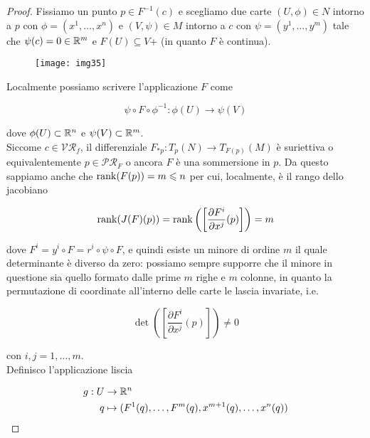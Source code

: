 \begin{proof}
	Fissiamo un punto $ p \in F^{-1}(c) $ e scegliamo due carte $ (U,\phi) \in N $ intorno a $ p $ con $ \phi = (x^{1},\dots,x^{n}) $ e $ (V,\psi) \in M $ intorno a $ c $ con $ \psi = (y^{1},\dots,y^{m}) $ tale che $ \psi(c)=0 \in \mathbb{R}^{m} $ e $ F(U) \subseteq V $+ (in quanto $ F $ è continua).
	
	\begin{figure}[H]
		\centering
		\texttt{[image: img35]}
	\end{figure}

	Localmente possiamo scrivere l'applicazione $ F $ come
	
	\begin{equation}
		\psi \circ F \circ \phi^{-1} : \phi(U) \to \psi(V)
	\end{equation}

	dove $ \phi(U) \subset \mathbb{R}^{n} $ e $ \psi(V) \subset \mathbb{R}^{m} $.\\
	Siccome $ c \in \mathcal{VR}_{f} $, il differenziale $ F_{*p} : T_{p}(N) \to T_{F(p)}(M) $ è suriettiva o equivalentemente $ p \in \mathcal{PR}_{F} $ o ancora $ F $ è una sommersione in $ p $. Da questo sappiamo anche che $ \rank(F(p)) = m \leqslant n $ per cui, localmente, è il rango dello jacobiano
	
	\begin{equation}
		\rank(J(F)(p)) = \rank \left( \left[ \dfrac{\partial F^{i}}{\partial x^{j}} (p) \right] \right) = m
	\end{equation}

	dove $ F^{i} = y^{i} \circ F = r^{i} \circ \psi \circ F $, e quindi esiste un minore di ordine $ m $ il quale determinante è diverso da zero: possiamo sempre supporre che il minore in questione sia quello formato dalle prime $ m $ righe e $ m $ colonne, in quanto la permutazione di coordinate all'interno delle carte le lascia invariate, i.e.
	
	\begin{equation}
		\det( \left[ \dfrac{\partial F^{i}}{\partial x^{j}} (p) \right] ) \neq 0
	\end{equation}

	con $ i,j=1,\dots,m $.\\
	Definisco l'applicazione liscia
	
	\begin{align}
		\begin{split}
			g : U &\to \mathbb{R}^{n}\\
			q &\mapsto (F^{1}(q),\dots,F^{m}(q),x^{m+1}(q),\dots,x^{n}(q))
		\end{split}
	\end{align}


\end{proof}

